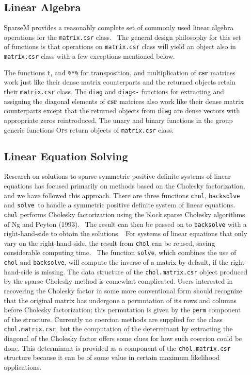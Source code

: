 \documentclass{article}
\begin{document}
\subsection{Linear Algebra}

SparseM provides a reasonably complete set of commonly used linear algebra operations for the 
\texttt{matrix.csr} class. \ The general design philosophy for 
this set of functions is that 
operations on \texttt{matrix.csr} class will yield an object also in
\texttt{matrix.csr} class with a few exceptions mentioned below.

The functions \texttt{t}, and \texttt{\%*\%} for
transposition, and multiplication of \textbf{csr} matrices work just like
their dense matrix counterparts and the returned objects retain their
\texttt{matrix.csr} class. The \texttt{diag} and \texttt{diag<-} 
functions for extracting and assigning the diagonal elements of
\textbf{csr} matrices also work like their dense matrix counterparts except
that the returned objects from \texttt{diag} are dense vectors with appropriate
zeros reintroduced.  The unary and binary functions in the group generic functions
\textsc{Ops} return objects of \texttt{matrix.csr} class.

\subsection{Linear Equation Solving} 
Research on solutions to sparse symmetric positive definite
systems of linear equations has focused primarily
on methods based on the Cholesky factorization, and we have followed this approach.
There are three functions \texttt{chol},
\texttt{backsolve} and \texttt{solve }to handle a symmetric positive definite
system of linear equations. \texttt{chol} performs Cholesky factorization
using the block sparse Cholesky algorithms of Ng and Peyton (1993). \ The
result can then be passed on to \texttt{backsolve} with a right-hand-side to
obtain the solutions. \ For systems of linear equations that only vary on the
right-hand-side, the result from \texttt{chol} can be reused,  saving
considerable computing time. \ The function \texttt{solve}, which
combines the use of \texttt{chol} and \texttt{backsolve}, 
will compute the inverse of a
matrix by default,  if the right-hand-side is missing.%
The data structure of the \texttt{chol.matrix.csr} object
produced by the sparse Cholesky method is comewhat complicated.
Users interested in recovering the Cholesky factor in some more
conventional form should recognize that the original matrix has
undergone a permutation of its rows and columns before Cholesky
factorization;  this permutation is given by the \texttt{perm}
component of the structure.  Currently no coercion methods are
supplied for the class \texttt{chol.matrix.csr}, but the
computation of the determinant by extracting the diagonal of
the Cholesky factor offers some clues for how such coercion
could be done.  This determinant is provided as a component
of the \texttt{chol.matrix.csr} structure because it can be
of some value in certain maximum likelihood applications.
\end{document}

